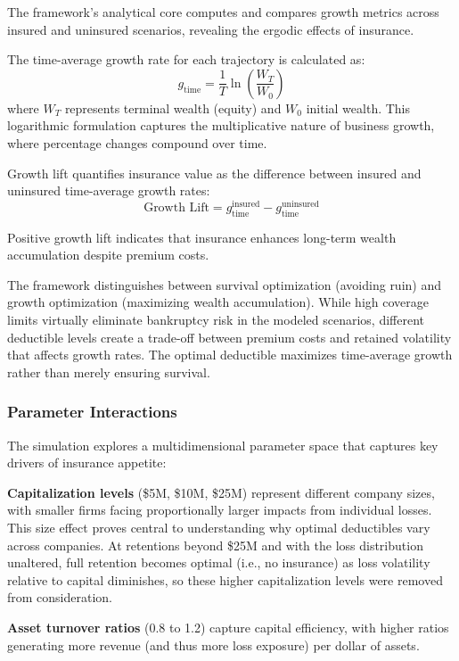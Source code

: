 \documentclass[11pt,letterpaper]{article}
\begin{document}
The framework's analytical core computes and compares growth metrics across insured and uninsured scenarios, revealing the ergodic effects of insurance.

The time-average growth rate for each trajectory is calculated as:
\begin{equation}
g_{\text{time}} = \frac{1}{T} \ln\left(\frac{W_T}{W_0}\right)
\end{equation}
where $W_T$ represents terminal wealth (equity) and $W_0$ initial wealth. This logarithmic formulation captures the multiplicative nature of business growth, where percentage changes compound over time.

Growth lift quantifies insurance value as the difference between insured and uninsured time-average growth rates:
\begin{equation}
\text{Growth Lift} = g_{\text{time}}^{\text{insured}} - g_{\text{time}}^{\text{uninsured}}
\end{equation}

Positive growth lift indicates that insurance enhances long-term wealth accumulation despite premium costs.

The framework distinguishes between survival optimization (avoiding ruin) and growth optimization (maximizing wealth accumulation). While high coverage limits virtually eliminate bankruptcy risk in the modeled scenarios, different deductible levels create a trade-off between premium costs and retained volatility that affects growth rates. The optimal deductible maximizes time-average growth rather than merely ensuring survival.

\subsubsection{Parameter Interactions}

The simulation explores a multidimensional parameter space that captures key drivers of insurance appetite:

\textbf{Capitalization levels} (\$5M, \$10M, \$25M) represent different company sizes, with smaller firms facing proportionally larger impacts from individual losses. This size effect proves central to understanding why optimal deductibles vary across companies. At retentions beyond \$25M and with the loss distribution unaltered, full retention becomes optimal (i.e., no insurance) as loss volatility relative to capital diminishes, so these higher capitalization levels were removed from consideration.

\textbf{Asset turnover ratios} (0.8 to 1.2) capture capital efficiency, with higher ratios generating more revenue (and thus more loss exposure) per dollar of assets.
\end{document}
